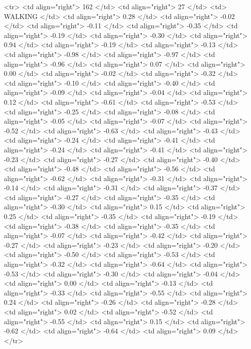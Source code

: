   <tr> <td align="right"> 162 </td> <td align="right">  27 </td> <td> WALKING </td> <td align="right"> 0.28 </td> <td align="right"> -0.02 </td> <td align="right"> -0.11 </td> <td align="right"> -0.35 </td> <td align="right"> -0.19 </td> <td align="right"> -0.30 </td> <td align="right"> 0.94 </td> <td align="right"> -0.19 </td> <td align="right"> -0.13 </td> <td align="right"> -0.98 </td> <td align="right"> -0.97 </td> <td align="right"> -0.96 </td> <td align="right"> 0.07 </td> <td align="right"> 0.00 </td> <td align="right"> -0.02 </td> <td align="right"> -0.32 </td> <td align="right"> -0.10 </td> <td align="right"> -0.40 </td> <td align="right"> -0.09 </td> <td align="right"> -0.04 </td> <td align="right"> 0.12 </td> <td align="right"> -0.61 </td> <td align="right"> -0.53 </td> <td align="right"> -0.25 </td> <td align="right"> -0.08 </td> <td align="right"> -0.05 </td> <td align="right"> -0.07 </td> <td align="right"> -0.52 </td> <td align="right"> -0.63 </td> <td align="right"> -0.43 </td> <td align="right"> -0.24 </td> <td align="right"> -0.41 </td> <td align="right"> -0.24 </td> <td align="right"> -0.41 </td> <td align="right"> -0.23 </td> <td align="right"> -0.27 </td> <td align="right"> -0.40 </td> <td align="right"> -0.48 </td> <td align="right"> -0.56 </td> <td align="right"> -0.62 </td> <td align="right"> -0.31 </td> <td align="right"> -0.14 </td> <td align="right"> -0.31 </td> <td align="right"> -0.37 </td> <td align="right"> -0.27 </td> <td align="right"> -0.35 </td> <td align="right"> -0.30 </td> <td align="right"> 0.15 </td> <td align="right"> 0.25 </td> <td align="right"> -0.35 </td> <td align="right"> -0.19 </td> <td align="right"> -0.38 </td> <td align="right"> -0.35 </td> <td align="right"> -0.07 </td> <td align="right"> -0.42 </td> <td align="right"> -0.27 </td> <td align="right"> -0.23 </td> <td align="right"> -0.20 </td> <td align="right"> -0.50 </td> <td align="right"> -0.53 </td> <td align="right"> -0.32 </td> <td align="right"> -0.64 </td> <td align="right"> -0.53 </td> <td align="right"> -0.30 </td> <td align="right"> -0.04 </td> <td align="right"> 0.00 </td> <td align="right"> -0.13 </td> <td align="right"> -0.33 </td> <td align="right"> -0.55 </td> <td align="right"> 0.24 </td> <td align="right"> -0.26 </td> <td align="right"> -0.28 </td> <td align="right"> 0.02 </td> <td align="right"> -0.52 </td> <td align="right"> -0.55 </td> <td align="right"> 0.15 </td> <td align="right"> -0.62 </td> <td align="right"> -0.64 </td> <td align="right"> 0.09 </td> </tr>
